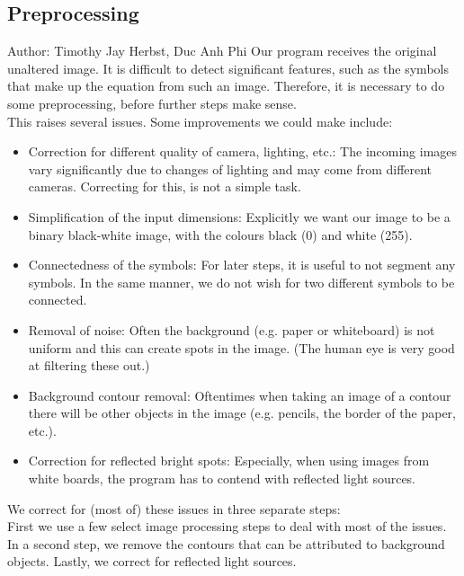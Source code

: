 \documentclass[12pt]{article}
\begin{document}
	\subsection{Preprocessing}
	\small{Author: Timothy Jay Herbst, Duc Anh Phi} \newline \newline
	Our program receives the original unaltered image.
	It is difficult to detect significant features, such as the symbols that make up the equation from such an image.
	Therefore, it is necessary to do some preprocessing, before further steps make sense.\\
	This raises several issues.
	Some improvements we could make include:\\
	\begin{itemize}
		\item Correction for different quality of camera, lighting, etc.:
		The incoming images vary significantly due to changes of lighting and may come from different cameras.
		Correcting for this, is not a simple task.
		\item Simplification of the input dimensions: Explicitly we want our image to be a binary black-white image, with the colours black (0) and white (255).
		\item Connectedness of the symbols: For later steps, it is useful to not segment any symbols. In the same manner, we do not wish for two different symbols to be connected.
		\item Removal of noise: Often the background (e.g. paper or whiteboard) is not uniform and this can create spots in the image. (The human eye is very good at filtering these out.)
		\item Background contour removal: Oftentimes when taking an image of a contour there will be other objects in the image (e.g. pencils, the border of the paper, etc.).
		\item Correction for reflected bright spots: Especially, when using images from white boards, the program has to contend with reflected light sources.
	\end{itemize}
		We correct for (most of) these issues in three separate steps:\\
		First we use a few select image processing steps to deal with most of the issues.
		In a second step, we remove the contours that can be attributed to background objects.
		Lastly, we correct for reflected light sources. %
\end{document}
